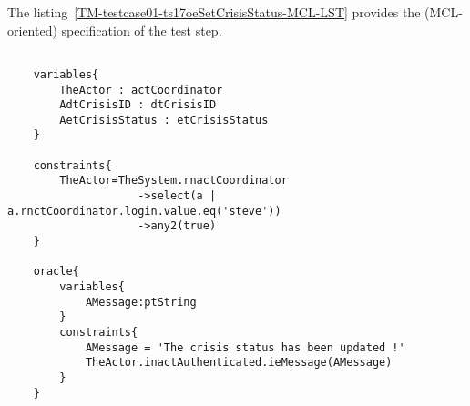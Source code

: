 	
	
		
	\vspace{1cm}
	The listing~\ref{TM-testcase01-ts17oeSetCrisisStatus-MCL-LST} provides the \msrmessir (MCL-oriented) specification of the test step.
	
	\scriptsize
	\vspace{0.5cm}
	\begin{lstlisting}[style=MessirStyle,firstnumber=auto,captionpos=b,caption={\msrmessir (MCL-oriented) specification of the test step \emph{testcase01-ts17oeSetCrisisStatus}.},label=TM-testcase01-ts17oeSetCrisisStatus-MCL-LST]

	variables{
		TheActor : actCoordinator
		AdtCrisisID : dtCrisisID
		AetCrisisStatus : etCrisisStatus
	}
	
	constraints{
		TheActor=TheSystem.rnactCoordinator
		            ->select(a | a.rnctCoordinator.login.value.eq('steve'))
		            ->any2(true)
	}
	
	oracle{
		variables{
			AMessage:ptString
		}
		constraints{
			AMessage = 'The crisis status has been updated !'
			TheActor.inactAuthenticated.ieMessage(AMessage)
		}
	}
	
	\end{lstlisting}
	\normalsize 
	
	
